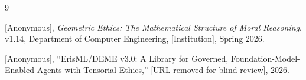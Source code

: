 \documentclass[12pt]{article}
\begin{document}
\begin{thebibliography}{9}

[Anonymous], \emph{Geometric Ethics: The Mathematical Structure of Moral Reasoning}, v1.14, Department of Computer Engineering, [Institution], Spring 2026.

[Anonymous], ``ErisML/DEME v3.0: A Library for Governed, Foundation-Model-Enabled Agents with Tensorial Ethics,'' [URL removed for blind review], 2026.

\end{thebibliography}
\end{document}

